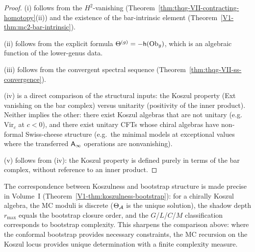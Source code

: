 \begin{proof}
(i) follows from the $H^2$-vanishing
(Theorem~\ref{thm:thqg-VII-contracting-homotopy}(ii))
and the existence of the bar-intrinsic element
(Theorem~\ref*{V1-thm:mc2-bar-intrinsic}).

(ii) follows from the explicit formula
$\Theta^{(g)} = -\mathsf{h}(\mathrm{Ob}_g)$, which is an algebraic
function of the lower-genus data.

(iii) follows from the convergent spectral sequence
(Theorem~\ref{thm:thqg-VII-ss-convergence}).

(iv) is a direct comparison of the structural inputs: the
Koszul property (Ext vanishing on the bar complex) versus
unitarity (positivity of the inner product). Neither
implies the other: there exist Koszul algebras that are not
unitary (e.g.\ $\mathrm{Vir}_c$ at $c < 0$), and there exist
unitary CFTs whose chiral algebras have non-formal Swiss-cheese
structure (e.g.\ the minimal models at exceptional values where the
transferred $\mathsf{A}_{\infty}$ operations are nonvanishing).

(v) follows from (iv): the Koszul property is defined purely
in terms of the bar complex, without reference to an inner
product.
\end{proof}

\begin{remark}
\label{rem:vol2-koszulness-bootstrap}
The correspondence between Koszulness and bootstrap structure
is made precise in Volume~I
\textup{(}Theorem~\textup{\ref*{V1-thm:koszulness-bootstrap})}: for
a chirally Koszul algebra, the MC moduli is discrete
\textup{(}$\Theta_{\mathcal{A}}$ is the unique solution\textup{)}, the shadow
depth $r_{\max}$ equals the bootstrap closure order, and the
$G$/$L$/$C$/$M$ classification corresponds to bootstrap complexity.
This sharpens the comparison above: where the conformal bootstrap
provides necessary constraints, the MC recursion on the Koszul locus
provides unique determination with a finite complexity measure.
\end{remark}

